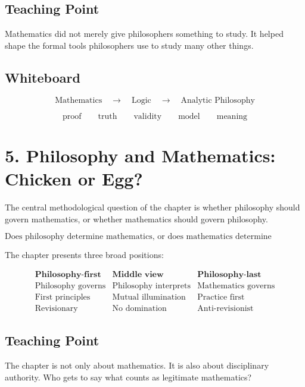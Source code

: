 \documentclass[11pt]{article}
\begin{document}
\subsection*{Teaching Point}

Mathematics did not merely give philosophers something to study. It helped shape the
formal tools philosophers use to study many other things.

\subsection*{Whiteboard}

\[
\text{Mathematics}
\quad \longrightarrow \quad
\text{Logic}
\quad \longrightarrow \quad
\text{Analytic Philosophy}
\]

\[
\text{proof} \qquad
\text{truth} \qquad
\text{validity} \qquad
\text{model} \qquad
\text{meaning}
\]

\section*{5. Philosophy and Mathematics: Chicken or Egg?}

The central methodological question of the chapter is whether philosophy should govern
mathematics, or whether mathematics should govern philosophy.

\[
\boxed{\text{Does philosophy determine mathematics, or does mathematics determine philosophy?}}
\]

The chapter presents three broad positions:

\[
\begin{array}{c|c|c}
\textbf{Philosophy-first} & \textbf{Middle view} & \textbf{Philosophy-last} \\
\hline
\text{Philosophy governs} & \text{Philosophy interprets} & \text{Mathematics governs} \\
\text{First principles} & \text{Mutual illumination} & \text{Practice first} \\
\text{Revisionary} & \text{No domination} & \text{Anti-revisionist}
\end{array}
\]

\subsection*{Teaching Point}

The chapter is not only about mathematics. It is also about disciplinary authority. Who gets
to say what counts as legitimate mathematics?
\end{document}
